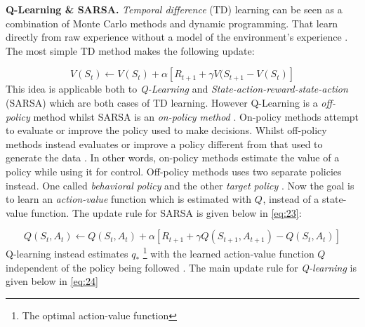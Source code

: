 \documentclass{kththesis}
\theoremstyle{definition}
\begin{document}
\textbf{Q-Learning \& SARSA.} \textit{Temporal difference} (TD) learning can be seen as a combination of Monte Carlo methods and dynamic programming. That learn directly from raw experience without a model of the environment's experience \parencite{sutton1998reinforcement, arulkumaran2017brief}. The most simple TD method makes the following update:

\begin{equation}
    \label{eq:22}
    V(S_t) \leftarrow V(S_t) + \alpha \left[R_{t+1} + \gamma V(S_{t+1} - V(S_t) \right]
\end{equation}
This idea is applicable both to \textit{Q-Learning} and \textit{State-action-reward-state-action} (SARSA) which are both cases of TD learning. 
\newline
\newline
However Q-Learning is a \textit{off-policy} method whilst SARSA is an \textit{on-policy method} \parencite{sutton1998reinforcement, arulkumaran2017brief}. On-policy methods attempt to evaluate or improve the policy used to make decisions. Whilst off-policy methods instead evaluates or improve a policy different from that used to generate the data \parencite{sutton1998reinforcement}. In other words, on-policy methods estimate the value of a policy while using it for control. Off-policy methods uses two separate policies instead. One called \textit{behavioral policy} and the other \textit{target policy} \parencite{sutton1998reinforcement}. Now the goal is to learn an \textit{action-value} function which is estimated with $Q^{}$, instead of a state-value function. The update rule for SARSA is given below in \autoref{eq:23}:

\begin{equation}
    \label{eq:23}
    Q(S_t, A_t) \leftarrow Q(S_t, A_t) + \alpha \left[R_{t+1} + \gamma Q(S_{t+1}, A_{t+1}) - Q(S_t, A_t) \right]
\end{equation}
Q-learning instead estimates  $q_{*}$ \footnote{The optimal action-value function} with the learned action-value function $Q$ independent of the policy being followed \parencite{sutton1998reinforcement}. 
The main update rule for \textit{Q-learning} is given below in \autoref{eq:24}
\end{document}

